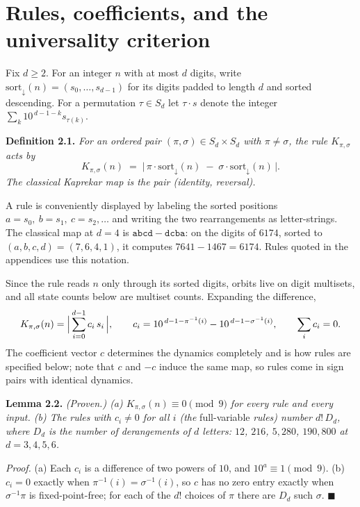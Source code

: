 \documentclass[11pt,letterpaper]{article}
\theoremstyle{paperstyle}
\theoremstyle{paperstyledef}
\theoremstyle{paperstylerem}
\begin{document}
\section{Rules, coefficients, and the universality criterion}\label{rules-coefficients-and-the-universality-criterion}

Fix \(d \geq 2\). For an integer \(n\) with at most \(d\) digits, write \(\mathrm{sort}_\downarrow(n) = (s_0, \dots, s_{d-1})\) for its digits padded to length \(d\) and sorted descending. For a permutation \(\tau \in S_d\) let \(\tau \cdot s\) denote the integer \(\sum_k 10^{\,d-1-k} s_{\tau(k)}\).

\textbf{Definition 2.1.} \emph{For an ordered pair \((\pi, \sigma) \in S_d \times S_d\) with \(\pi \neq \sigma\), the rule \(K_{\pi,\sigma}\) acts by} \[K_{\pi,\sigma}(n) \;=\; \bigl|\, \pi \cdot \mathrm{sort}_\downarrow(n) \;-\; \sigma \cdot \mathrm{sort}_\downarrow(n) \,\bigr|.\] \emph{The classical Kaprekar map is the pair (identity, reversal).}

A rule is conveniently displayed by labeling the sorted positions \(a = s_0,\ b = s_1,\ c = s_2, \dots\) and writing the two rearrangements as letter-strings. The classical map at \(d = 4\) is \(\mathtt{abcd} - \mathtt{dcba}\): on the digits of \(6174\), sorted to \((a,b,c,d) = (7,6,4,1)\), it computes \(7641 - 1467 = 6174\). Rules quoted in the appendices use this notation.

Since the rule reads \(n\) only through its sorted digits, orbits live on digit multisets, and all state counts below are multiset counts. Expanding the difference, \[K_{\pi,\sigma}(n) = \Bigl|\, \sum_{i=0}^{d-1} c_i\, s_i \,\Bigr|, \qquad c_i = 10^{\,d-1-\pi^{-1}(i)} - 10^{\,d-1-\sigma^{-1}(i)}, \qquad \sum_i c_i = 0.\] The coefficient vector \(c\) determines the dynamics completely and is how rules are specified below; note that \(c\) and \(-c\) induce the same map, so rules come in sign pairs with identical dynamics.

\textbf{Lemma 2.2.} \emph{(Proven.) (a) \(K_{\pi,\sigma}(n) \equiv 0 \pmod 9\) for every rule and every input. (b) The rules with \(c_i \neq 0\) for all \(i\) (the} full-variable \emph{rules) number \(d!\,D_d\), where \(D_d\) is the number of derangements of \(d\) letters: \(12\), \(216\), \(5{,}280\), \(190{,}800\) at \(d = 3,4,5,6\).}

\emph{Proof.} (a) Each \(c_i\) is a difference of two powers of \(10\), and \(10^a \equiv 1 \pmod 9\). (b) \(c_i = 0\) exactly when \(\pi^{-1}(i) = \sigma^{-1}(i)\), so \(c\) has no zero entry exactly when \(\sigma^{-1}\pi\) is fixed-point-free; for each of the \(d!\) choices of \(\pi\) there are \(D_d\) such \(\sigma\). \(\blacksquare\)
\end{document}
